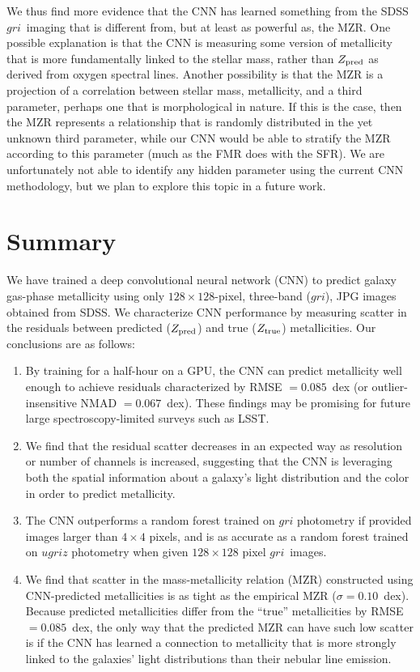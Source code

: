 \documentclass[fleqn,usenatbib]{mnras}
\newcommand{\sdssg}{\hbox{$g$}}
\newcommand{\sdssr}{\hbox{$r$}}
\newcommand{\sdssi}{\hbox{$i$}}
\begin{document}
We thus find more evidence that the CNN has learned something from the SDSS \sdssg\sdssr\sdssi\ imaging that is different from, but at least as powerful as, the MZR. One possible explanation is that the CNN is measuring some version of metallicity that is more fundamentally linked to the stellar mass, rather than $Z_{\rm pred}$ as derived from oxygen spectral lines. Another possibility is that the MZR is a projection of a correlation between stellar mass, metallicity, and a third parameter, perhaps one that is morphological in nature. If this is the case, then the \cite{Tremonti2004} MZR represents a relationship that is randomly distributed in the yet unknown third parameter, while our CNN would be able to stratify the MZR according to this parameter (much as the FMR does with the SFR). We are unfortunately not able to identify any hidden parameter using the current CNN methodology, but we plan to explore this topic in a future work.

\section{Summary}\label{sec:summary}
We have trained a deep convolutional neural network (CNN) to predict galaxy gas-phase metallicity using only $128 \times 128$-pixel, three-band (\sdssg\sdssr\sdssi), JPG images obtained from SDSS. We characterize CNN performance by measuring scatter in the residuals between predicted ($Z_{\rm pred}$) and true ($Z_{\rm true}$) metallicities.
Our conclusions are as follows:

\begin{enumerate}
	\item By training for a half-hour on a GPU, the CNN can predict metallicity well enough to achieve residuals characterized by RMSE $= 0.085$~dex (or outlier-insensitive NMAD $= 0.067$~dex). These findings may be promising for future large spectroscopy-limited surveys such as LSST.

	\item We find that the residual scatter decreases in an expected way as resolution or number of channels is increased, suggesting that the CNN is leveraging both the spatial information about a galaxy's light distribution and the color in order to predict metallicity.

	\item The CNN outperforms a random forest trained on $gri$ photometry if provided images larger than $4\times 4$ pixels, and is as accurate as a random forest trained on $ugriz$ photometry when given $128 \times 128$ pixel \sdssg\sdssr\sdssi\ images.

	\item We find that scatter in the mass-metallicity relation (MZR) constructed using CNN-predicted metallicities is as tight as the empirical MZR ($\sigma = 0.10$~dex).	Because predicted metallicities differ from the ``true'' metallicities by RMSE $= 0.085$~dex, the only way that the predicted MZR can have such low scatter is if the CNN has learned a connection to metallicity that is more strongly linked to the galaxies' light distributions than their nebular line emission.
\end{enumerate}
\end{document}
